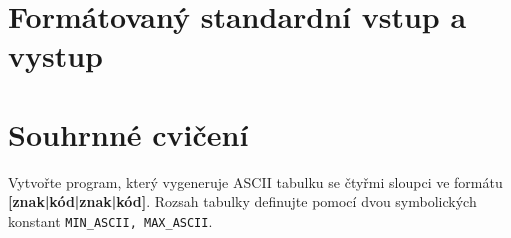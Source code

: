   \section{Formátovaný standardní vstup a vystup}
  \section{Souhrnné cvičení}
    \begin{example}Vytvořte program, který vygeneruje ASCII tabulku se čtyřmi sloupci ve formátu \textbf{[znak|kód|znak|kód]}.
      Rozsah tabulky definujte pomocí dvou symbolických konstant \lstinline[basicstyle=\ttfamily]!MIN_ASCII, MAX_ASCII!.

      
      \begin{lstlisting}[caption=\texttt{ASCII.c} Generuje ASCII tabulku na terminálu.]
      \end{lstlisting}
    \end{example} 